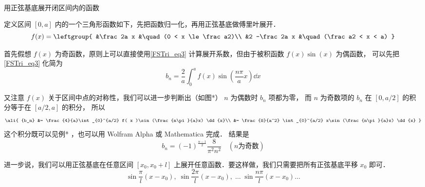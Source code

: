 \begin{exam}{用正弦基底展开闭区间内的函数}

定义区间 $[0,a]$ 内的一个三角形函数如下，先把函数归一化，再用正弦基底做傅里叶展开．
\begin{equation}
f(x) = \leftgroup{
&\frac 2a x &\quad (0 < x \le \frac a2)\\
&2 -\frac 2a x &\quad (\frac a2 < x < a)
}\end{equation}

首先假想 $f(x)$ 为奇函数，原则上可以直接使用\autoref{FSTri_eq3} 计算展开系数，但由于被积函数 $f(x)\sin(x)$ 为偶函数， 可以先把\autoref{FSTri_eq3} 化简为%
\begin{equation}
{b_n} = \frac{2}{a}\int_{0}^a f( x )\sin (\frac{n\pi}{a}x) \dd{x}
\end{equation}


又注意 $f(x)$ 关于区间中点的对称性，我们可以进一步判断出（如图*） $n$ 为偶数时 $b_n$ 项都为零， 而 $n$ 为奇数项的 $b_n$ 在 $[0,a/2]$ 的积分等于在 $[a/2,a]$ 的积分， 所以
\begin{equation}
\ali{
{b_n} &= \frac{4}{a}\int_{0}^{a/2} f( x )\sin (\frac{n\pi}{a}x) \dd{x}\\
&= \frac{8}{a^2} \int_{0}^{a/2} x\sin (\frac{n\pi}{a}x) \dd{x}
}\end{equation}
这个积分既可以见例*%
，也可以用 Wolfram Alpha 或 Mathematica 完成．%
结果是
\begin{equation}
b_n = (-1)^{\frac{n-1}{2}} \frac{8}{\pi^2 n^2} \quad (n\text{为奇数})
\end{equation}

\end{exam}

进一步说，我们可以用正弦基底在任意区间 $[x_0,x_0+l]$ 上展开任意函数．要这样做，我们只需要把所有正弦基底平移 $x_0$ 即可．
\begin{equation}
\sin\frac{\pi}{l} (x-x_0),\;   \sin\frac{2\pi}{l} (x-x_0),\;    \dots\;\sin\frac{n\pi}{l} (x-x_0) \dots
\end{equation}


